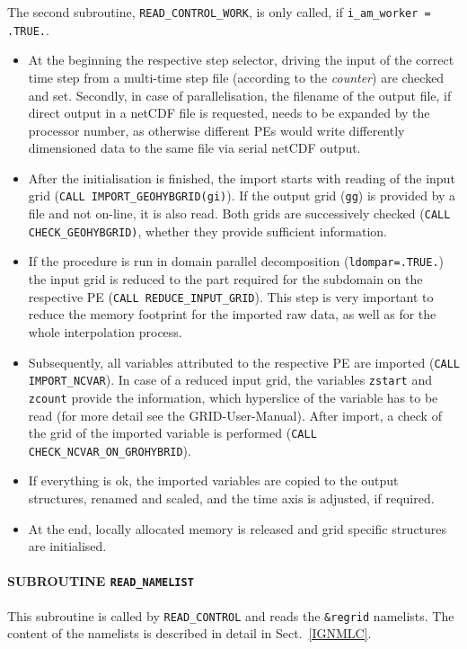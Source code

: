 \documentclass[11pt,twoside]{report}
\begin{document}
The second subroutine, \verb|READ_CONTROL_WORK|, is only called, if 
 \verb|i_am_worker = .TRUE.|.
\begin{itemize}
\item At the beginning the respective step selector, driving the input of the
correct time step from a multi-time step file (according to the {\it
counter}) are checked and set.
Secondly, in case of parallelisation, the filename of the output file, if
direct output in a netCDF file is requested, needs to be expanded by the
processor number, as otherwise different PEs would write differently
dimensioned data to the same file via serial netCDF output.
\item After the initialisation is finished, the import starts with
reading of the input grid (\verb|CALL IMPORT_GEOHYBGRID(gi)|). 
If the output grid (\verb|gg|) is provided by a file
and not on-line, it is also read.
 Both grids are successively checked (\verb|CALL CHECK_GEOHYBGRID)|,
 whether they provide sufficient information.
\item If the procedure is run in domain parallel decomposition 
(\verb|ldompar=.TRUE.|) the input grid is reduced to the part required for
the subdomain on the respective PE (\verb|CALL REDUCE_INPUT_GRID|). This step
is very important to reduce the memory footprint for the imported raw
data, as well as for the whole interpolation process.
\item Subsequently, all variables attributed to the respective PE are imported
(\verb|CALL IMPORT_NCVAR|). In case of a reduced input grid, the variables 
\verb|zstart| and \verb|zcount| provide the information, which
hyperslice of the
variable has to be read (for more detail see the GRID-User-Manual).
After import, a check of the grid of the imported variable is performed
(\verb|CALL CHECK_NCVAR_ON_GROHYBRID|).
\item If everything is ok, the imported variables are copied to the
output structures, renamed and scaled, and the time
axis is adjusted, if required.
\item At the end, locally allocated memory is released and grid
specific structures are initialised.
\end{itemize}

\paragraph{SUBROUTINE \color{blue} \tt\bf READ\_NAMELIST\\ \label{IGREADNML}}
This subroutine is called by \verb|READ_CONTROL| and reads
the \verb|&regrid| namelists. The content of the namelists is
described in detail in Sect.~\ref{IGNMLC}.
\end{document}
